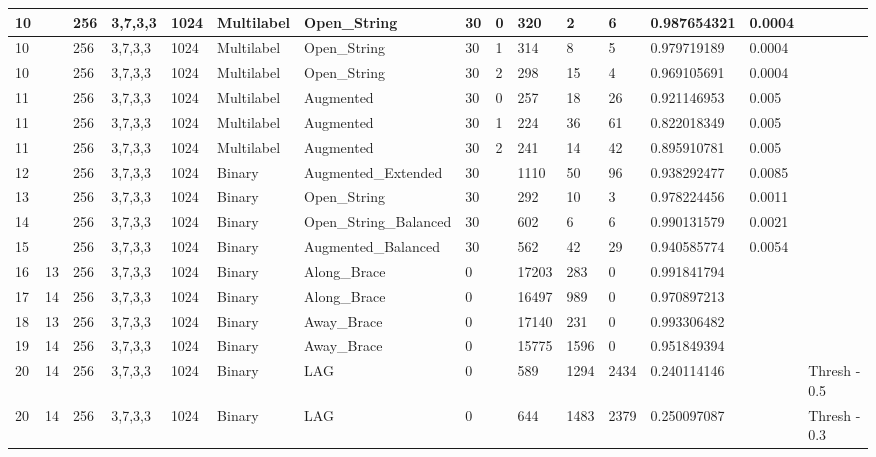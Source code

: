 \documentclass[conference]{IEEEtran}
\begin{document}
\begin{table}[!ht]
\begin{adjustbox}{width=\textwidth}
\begin{tabular}{|l|l|l|l|l|l|l|l|l|l|l|l|l|l|l|}
                10 & ~ & 256 & 3,7,3,3 & 1024 & Multilabel & Open\_String & 30 & 0 & 320 & 2 & 6 & 0.987654321 & 0.0004 & ~ \\ \hline
                10 & ~ & 256 & 3,7,3,3 & 1024 & Multilabel & Open\_String & 30 & 1 & 314 & 8 & 5 & 0.979719189 & 0.0004 & ~ \\ \hline
                10 & ~ & 256 & 3,7,3,3 & 1024 & Multilabel & Open\_String & 30 & 2 & 298 & 15 & 4 & 0.969105691 & 0.0004 & ~ \\ \hline
                11 & ~ & 256 & 3,7,3,3 & 1024 & Multilabel & Augmented & 30 & 0 & 257 & 18 & 26 & 0.921146953 & 0.005 & ~ \\ \hline
                11 & ~ & 256 & 3,7,3,3 & 1024 & Multilabel & Augmented & 30 & 1 & 224 & 36 & 61 & 0.822018349 & 0.005 & ~ \\ \hline
                11 & ~ & 256 & 3,7,3,3 & 1024 & Multilabel & Augmented & 30 & 2 & 241 & 14 & 42 & 0.895910781 & 0.005 & ~ \\ \hline
                12 & ~ & 256 & 3,7,3,3 & 1024 & Binary & Augmented\_Extended & 30 & ~ & 1110 & 50 & 96 & 0.938292477 & 0.0085 & ~ \\ \hline
                13 & ~ & 256 & 3,7,3,3 & 1024 & Binary & Open\_String & 30 & ~ & 292 & 10 & 3 & 0.978224456 & 0.0011 & ~ \\ \hline
                14 & ~ & 256 & 3,7,3,3 & 1024 & Binary & Open\_String\_Balanced & 30 & ~ & 602 & 6 & 6 & 0.990131579 & 0.0021 & ~ \\ \hline
                15 & ~ & 256 & 3,7,3,3 & 1024 & Binary & Augmented\_Balanced & 30 & ~ & 562 & 42 & 29 & 0.940585774 & 0.0054 & ~ \\ \hline
                16 & 13 & 256 & 3,7,3,3 & 1024 & Binary & Along\_Brace & 0 & ~ & 17203 & 283 & 0 & 0.991841794 & ~ & ~ \\ \hline
                17 & 14 & 256 & 3,7,3,3 & 1024 & Binary & Along\_Brace & 0 & ~ & 16497 & 989 & 0 & 0.970897213 & ~ & ~ \\ \hline
                18 & 13 & 256 & 3,7,3,3 & 1024 & Binary & Away\_Brace & 0 & ~ & 17140 & 231 & 0 & 0.993306482 & ~ & ~ \\ \hline
                19 & 14 & 256 & 3,7,3,3 & 1024 & Binary & Away\_Brace & 0 & ~ & 15775 & 1596 & 0 & 0.951849394 & ~ & ~ \\ \hline
                20 & 14 & 256 & 3,7,3,3 & 1024 & Binary & LAG & 0 & ~ & 589 & 1294 & 2434 & 0.240114146 & ~ & Thresh - 0.5 \\ \hline
                20 & 14 & 256 & 3,7,3,3 & 1024 & Binary & LAG & 0 & ~ & 644 & 1483 & 2379 & 0.250097087 & ~ & Thresh - 0.3 \\ \hline

\end{tabular}
\end{adjustbox}
\end{table}
\end{document}
